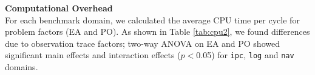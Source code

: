 \textbf{Computational Overhead}\\
For each benchmark domain, we calculated the average CPU time per cycle for problem factors (EA and PO). As shown in Table \ref{tab:cpu2}, we found differences due to observation trace factors; two-way ANOVA on EA and PO showed significant main effects and interaction effects ($p<$0.05) for \texttt{ipc}, \texttt{log} and \texttt{nav} domains.
\begin{table}[tpb]
  \centering
    \caption{Mean CPU time in seconds for problem factors for each domain. $\Delta$ is the difference between the max and min times for each domain.}
  \label{tab:cpu2}
\end{table}



